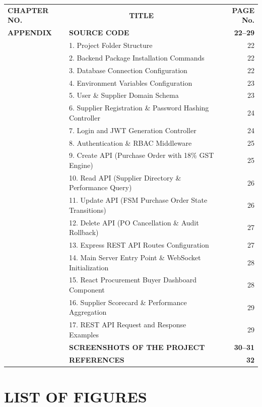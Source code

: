 \documentclass[12pt,a4paper,oneside]{report}
\begin{document}
\clearpage

\noindent
\begin{tabularx}{\textwidth}{@{}p{3.2cm}X r@{}}
\textbf{CHAPTER NO.} & \multicolumn{1}{c}{\textbf{TITLE}} & \textbf{PAGE No.} \\[0.3cm]
\textbf{APPENDIX} & \textbf{SOURCE CODE} & \textbf{22--29} \\
& 1. Project Folder Structure & 22 \\
& 2. Backend Package Installation Commands & 22 \\
& 3. Database Connection Configuration & 22 \\
& 4. Environment Variables Configuration & 23 \\
& 5. User \& Supplier Domain Schema & 23 \\
& 6. Supplier Registration \& Password Hashing Controller & 24 \\
& 7. Login and JWT Generation Controller & 24 \\
& 8. Authentication \& RBAC Middleware & 25 \\
& 9. Create API (Purchase Order with 18\% GST Engine) & 25 \\
& 10. Read API (Supplier Directory \& Performance Query) & 26 \\
& 11. Update API (FSM Purchase Order State Transitions) & 26 \\
& 12. Delete API (PO Cancellation \& Audit Rollback) & 27 \\
& 13. Express REST API Routes Configuration & 27 \\
& 14. Main Server Entry Point \& WebSocket Initialization & 28 \\
& 15. React Procurement Buyer Dashboard Component & 28 \\
& 16. Supplier Scorecard \& Performance Aggregation & 29 \\
& 17. REST API Request and Response Examples & 29 \\
& \textbf{SCREENSHOTS OF THE PROJECT} & \textbf{30--31} \\
& \textbf{REFERENCES} & \textbf{32} \\
\end{tabularx}

\clearpage
\chapter*{LIST OF FIGURES}
\end{document}
